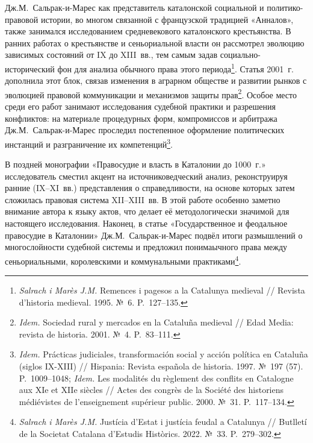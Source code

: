 Дж.М.~Сальрак-и-Марес как представитель каталонской социальной и политико-правовой истории, во многом связанной с французской традицией «Анналов», также занимался исследованием средневекового каталонского крестьянства. В ранних работах о крестьянстве и сеньориальной власти он рассмотрел эволюцию зависимых состояний от IX до XIII~вв., тем самым задав социально-исторический фон для анализа обычного права этого периода\footnote{\emph{Salrach i Marès J.M.} Remences i pagesos a la Catalunya medieval // Revista d’historia medieval. 1995. №~6. P.~127--135.}. Статья 2001~г. дополнила этот блок, связав изменения в аграрном обществе и развитии рынков с эволюцией правовой коммуникации и механизмов защиты прав\footnote{\emph{Idem.} Sociedad rural y mercados en la Cataluña medieval // Edad Media: revista de historia. 2001. №~4. P.~83--111.}. Особое место среди его работ занимают исследования судебной практики и разрешения конфликтов: на материале процедурных форм, компромиссов и арбитража Дж.М.~Сальрак-и-Марес проследил постепенное оформление политических инстанций и разграничение их компетенций\footnote{\emph{Idem.} Prácticas judiciales, transformación social y acción política en Cataluña (siglos IX-XIII) // Hispania: Revista española de historia. 1997. №~197 (57). P.~1009--1048; \emph{Idem.}  Les modalités du règlement des conflits en Catalogne aux XIe et XIIe siècles // Actes des congrès de la Société des historiens médiévistes de l’enseignement supérieur public. 2000. №~31. P.~117--134.}.

В поздней монографии «Правосудие и власть в Каталонии до 1000~г.» исследователь сместил акцент на источниковедческий анализ, реконструируя ранние (IX--XI~вв.) представления о справедливости, на основе которых затем сложилась правовая система XII--XIII~вв. В этой работе особенно заметно внимание автора к языку актов, что делает её методологически значимой для настоящего исследования. Наконец, в статье «Государственное и феодальное правосудие в Каталонии» Дж.М.~Сальрак-и-Марес подвёл итоги размышлений о многослойности судебной системы и предложил понимаычного права между сеньориальными, королевскими и коммунальными практиками\footnote{\emph{Salrach i Marès J.M.} Justícia d’Estat i justícia feudal a Catalunya // Butlletí de la Societat Catalana d’Estudis Històrics. 2022. №~33. P.~279--302.}.

